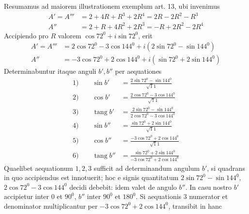 Resumamus ad maiorem illustrationem exemplum art. 13, ubi invenimus
\[
\begin{aligned}
A'=A'''&=2+4R+R^3+2R^4=2R-2R^2-R^3\\
A''&=2+R+4R^2+2R^3=-R+2R^2-2R^4
\end{aligned}
\]
Accipiendo pro $R$ valorem $\cos72^0+i\sin72^0$, erit
\[
\begin{aligned}
A'=A'''&=2\cos72^0-3\cos144^0+i(2\sin72^0-\sin144^0)\\
A''&=-3\cos72^0+2\cos144^0+i(\sin72^0+2\sin144^0)
\end{aligned}
\]
Determinabuntur itaque anguli $b',b''$ per aequationes
\[
\begin{aligned}
1)\qquad\sin b'&=\frac{2\sin72^0-\sin144^0}{\surd11}\\
2)\qquad\cos b'&=\frac{2\cos72^0-3\cos144^0}{\surd11}\\
3)\qquad\operatorname{tang}b'&=\frac{2\sin72^0-\sin144^0}{2\cos72^0-3\cos144^0}\\
4)\qquad\sin b''&=\frac{\sin72^0+2\sin144^0}{\surd11}\\
5)\qquad\cos b''&=\frac{-3\cos72^0+2\cos144^0}{\surd11}\\
6)\qquad\operatorname{tang}b''&=\frac{\sin72^0+2\sin144^0}{-3\cos72^0+2\cos144^0}
\end{aligned}
\]
Quaelibet aequationum $1,2,3$ sufficit ad determinandum angulum $b'$, si quadrans in quo accipiendus est innotuerit; hoc e signis quantitatum $2\sin72^0-\sin144^0$, $2\cos72^0-3\cos144^0$ decidi debebit: idem valet de angulo $b''$. In casu nostro $b'$ accipietur inter $0$ et $90^0$, $b''$ inter $90^0$ et $180^0$. Si aequationis $3$ numerator et denominator multiplicantur per $-3\cos72^0+2\cos144^0$, transibit in hanc
